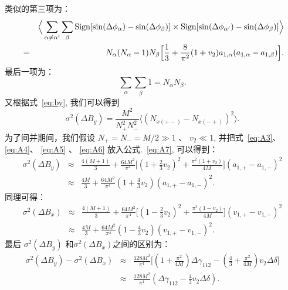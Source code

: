类似的第三项为：
\begin{eqnarray}
& &\Big\langle\sum_{\alpha\neq\alpha'}\sum_{\beta} {\rm Sign}[\sin(\Delta\phi_\alpha)-\sin(\Delta\phi_\beta)]\times{\rm Sign}[\sin(\Delta\phi_{\alpha'})-\sin(\Delta\phi_{\beta})]\Big\rangle  \nonumber \\
&=& N_\alpha(N_\alpha-1) N_\beta\Big[\frac{1}{3}+\frac{8}{\pi^2}(1+v_2)a_{1,\alpha}(a_{1,\alpha}-a_{1,\beta}) \Big].
\label{eq:A5}
\end{eqnarray}
最后一项为：
\begin{equation}
\sum_{\alpha}\sum_{\beta} 1 = N_\alpha N_\beta. 
\label{eq:A6}
\end{equation}
又根据式~\ref{eq:by}, 我们可以得到
\begin{equation}
\sigma^2(\Delta B_y) = \frac{M^2}{N_+^2 N_-^2} \langle  (N_{x(+-)}-N_{x(-+)})^2  \rangle.
\label{eq:A7}
\end{equation}
为了间并期间，我们假设 $N_+ = N_- = M/2 \gg 1$ 、 $v_2 \ll 1$, 并把式~\ref{eq:A3}、 \ref{eq:A4}、 \ref{eq:A5} 、 \ref{eq:A6} 放入公式.~\ref{eq:A7}, 可以得到：
\begin{eqnarray}
\sigma^2(\Delta B_y) &\approx& \frac{4(M+1)}{3}+ \frac{64M^2}{\pi^4}\Big[(1+\frac{2}{3}v_2)^2+\frac{\pi^2(1+v_2)}{4M}\Big](a_{1,+}-a_{1,-})^2 \nonumber \\
&\approx& \frac{4M}{3}+ \frac{64M^2}{\pi^4}(1+ \frac{4}{3}v_2)(a_{1,+}-a_{1,-})^2.    
\end{eqnarray}
同理可得：
\begin{eqnarray}
\sigma^2(\Delta B_x) &\approx& \frac{4(M+1)}{3}+ \frac{64M^2}{\pi^4}\Big[(1-\frac{2}{3}v_2)^2+\frac{\pi^2(1-v_2)}{4M}\Big](v_{1,+}-v_{1,-})^2 \nonumber \\
&\approx& \frac{4M}{3}+ \frac{64M^2}{\pi^4}(1- \frac{4}{3}v_2)(v_{1,+}-v_{1,-})^2.    
\end{eqnarray}
最后 $\sigma^2(\Delta B_y)$ 和$\sigma^2(\Delta B_x)$之间的区别为：
\begin{eqnarray}
\sigma^2(\Delta B_y) - \sigma^2(\Delta B_x) &\approx& \frac{128M^2}{\pi^4}\Big[(1+\frac{\pi^2}{4M})\Delta\gamma_{112}-(\frac{4}{3}+\frac{\pi^2}{4M})v_2\Delta\delta\Big] \\
&\approx& \frac{128M^2}{\pi^4}(\Delta\gamma_{112}-\frac{4}{3}v_2\Delta\delta).
\end{eqnarray}

\setcounter{figure}{0}
\setcounter{table}{0}
\setcounter{equation}{0}

